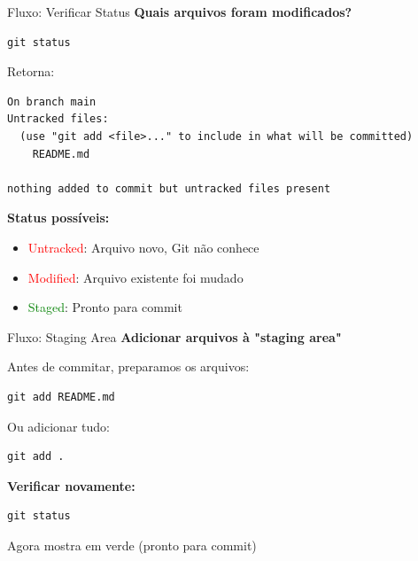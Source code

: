 \documentclass[11pt]{beamer}
\begin{document}
\begin{frame}{Fluxo: Verificar Status}
\textbf{Quais arquivos foram modificados?}

\begin{lstlisting}
git status
\end{lstlisting}

\vspace{0.3cm}

Retorna:
\begin{lstlisting}
On branch main
Untracked files:
  (use "git add <file>..." to include in what will be committed)
	README.md

nothing added to commit but untracked files present
\end{lstlisting}

\vspace{0.3cm}

\textbf{Status possíveis:}
\begin{itemize}
    \small
    \item \textcolor{red}{Untracked}: Arquivo novo, Git não conhece
    \item \textcolor{red}{Modified}: Arquivo existente foi mudado
    \item \textcolor{green}{Staged}: Pronto para commit
\end{itemize}
\end{frame}

\begin{frame}{Fluxo: Staging Area}
\textbf{Adicionar arquivos à "staging area"}

Antes de commitar, preparamos os arquivos:

\begin{lstlisting}
git add README.md
\end{lstlisting}

Ou adicionar tudo:
\begin{lstlisting}
git add .
\end{lstlisting}

\vspace{0.5cm}

\textbf{Verificar novamente:}
\begin{lstlisting}
git status
\end{lstlisting}

Agora mostra em verde (pronto para commit)
\end{frame}
\end{document}
